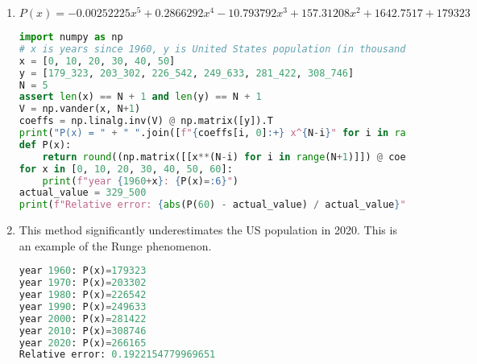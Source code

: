 \documentclass{article}
\begin{document}
\begin{enumerate}[label=(\alph*)]
    \item
        \[ P(x) = -0.00252225 x^5 +0.2866292 x^4 -10.793792 x^3 +157.31208 x^2 +1642.7517 +179323 \]
\begin{lstlisting}[language=Python]
import numpy as np
# x is years since 1960, y is United States population (in thousands)
x = [0, 10, 20, 30, 40, 50]
y = [179_323, 203_302, 226_542, 249_633, 281_422, 308_746]
N = 5
assert len(x) == N + 1 and len(y) == N + 1
V = np.vander(x, N+1)
coeffs = np.linalg.inv(V) @ np.matrix([y]).T
print("P(x) = " + " ".join([f"{coeffs[i, 0]:+} x^{N-i}" for i in range(N+1)]))
def P(x):
    return round((np.matrix([[x**(N-i) for i in range(N+1)]]) @ coeffs)[0, 0])
for x in [0, 10, 20, 30, 40, 50, 60]:
    print(f"year {1960+x}: {P(x)=:6}")
actual_value = 329_500
print(f"Relative error: {abs(P(60) - actual_value) / actual_value}")
\end{lstlisting}
    \item This method significantly underestimates the US population in 2020. This is an example of the Runge phenomenon.
\begin{lstlisting}[language=Python]
year 1960: P(x)=179323
year 1970: P(x)=203302
year 1980: P(x)=226542
year 1990: P(x)=249633
year 2000: P(x)=281422
year 2010: P(x)=308746
year 2020: P(x)=266165
Relative error: 0.1922154779969651
\end{lstlisting}
\end{enumerate}
\end{document}

